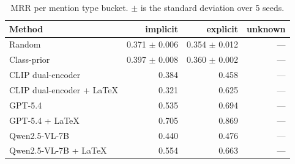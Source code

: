 \begin{table}[t]
\centering
\caption{MRR per mention type bucket. $\pm$ is the standard deviation over 5 seeds.}
\label{tab:bd_mention_type_mrr}
\begin{tabular}{lrrr}
\toprule
Method & implicit & explicit & unknown \\
\midrule
Random & 0.371 $\pm$ 0.006 & 0.354 $\pm$ 0.012 & — \\
Class-prior & 0.397 $\pm$ 0.008 & 0.360 $\pm$ 0.002 & — \\
CLIP dual-encoder & 0.384 & 0.458 & — \\
CLIP dual-encoder + LaTeX & 0.321 & 0.625 & — \\
GPT-5.4 & 0.535 & 0.694 & — \\
GPT-5.4 + LaTeX & 0.705 & 0.869 & — \\
Qwen2.5-VL-7B & 0.440 & 0.476 & — \\
Qwen2.5-VL-7B + LaTeX & 0.554 & 0.663 & — \\
\bottomrule
\end{tabular}
\end{table}
